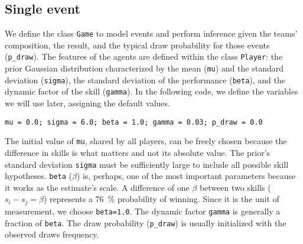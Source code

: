 \documentclass[article]{jss}
\begin{document}
\subsection{Single event} \label{sec:singleEvent}

We define the class \texttt{Game} to model events and perform inference given the teams' composition, the result, and the typical draw probability for those events (\texttt{p\_draw}). 
The features of the agents are defined within the class \texttt{Player}: the prior Gaussian distribution characterized by the mean (\texttt{mu}) and the standard deviation (\texttt{sigma}), the standard deviation of the performance (\texttt{beta}), and the dynamic factor of the skill (\texttt{gamma}). 
In the following code, we define the variables we will use later, assigning the default values. 
%
\begin{lstlisting}[captionpos=b,backgroundcolor=\color{all},label=lst:parameters, caption={Package parameters and their default values.},belowskip=0.cm]
mu = 0.0; sigma = 6.0; beta = 1.0; gamma = 0.03; p_draw = 0.0
\end{lstlisting}
%
The initial value of \texttt{mu}, shared by all players, can be freely chosen because the difference in skills is what matters and not its absolute value. 
The prior's standard deviation \texttt{sigma} must be sufficiently large to include all possible skill hypotheses. 
\texttt{beta} ($\beta$) is, perhaps, one of the most important parameters because it works as the estimate’s scale.  
A difference of one $\beta$ between two skills ($ s_i - s_j = \beta $) represents a \SI{76}{\percent} probability of winning. 
Since it is the unit of measurement, we choose \texttt{beta=1.0}. 
The dynamic factor \texttt{gamma} is generally a fraction of \texttt{beta}. 
The draw probability (\texttt{p\_draw}) is usually initialized with the observed draws frequency. 
%
\end{document}
